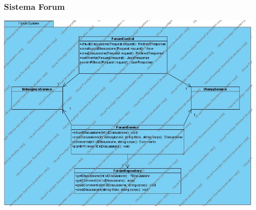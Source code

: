 \subsubsection{Sistema Forum}
\begin{center}
\includegraphics[width=\textwidth,height=\textheight,keepaspectratio]{Figure/ClassDiagramForum.jpg}
\end{center}
